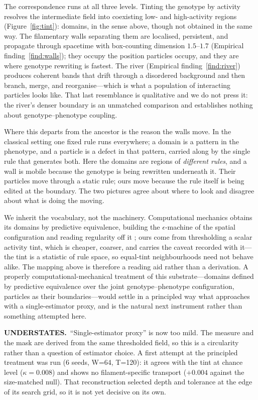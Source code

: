 \documentclass[man,12pt,floatsintext,donotrepeattitle]{apa7}
\newcommand{\flagged}[3]{%
  \par\vspace{3pt}\noindent
  \colorbox{#1}{\parbox{\dimexpr\linewidth-2\fboxsep\relax}{%
    \footnotesize\textbf{#2}\ #3}}%
  \par\vspace{3pt}}
\newcommand{\secref}[1]{\emph{\nameref{#1}}}
\begin{document}
The correspondence runs at all three levels. Tinting the genotype by activity
resolves the intermediate field into coexisting low- and high-activity regions
(Figure~\ref{fig:tint}): domains, in the sense above, though not obtained in
the same way. The filamentary walls separating them are localised, persistent,
and propagate through spacetime with box-counting dimension $1.5$--$1.7$
(Empirical finding~\ref{find:walls}); they occupy the position particles
occupy, and they are where genotype rewriting is fastest. The river (Empirical
finding~\ref{find:river}) produces coherent bands that drift through a
disordered background and then branch, merge, and reorganise---which is what a
population of interacting particles looks like. That last resemblance is
qualitative and we do not press it: the river's denser boundary is an unmatched
comparison and establishes nothing about genotype--phenotype coupling.

Where this departs from the ancestor is the reason the walls move. In the
classical setting one fixed rule runs everywhere; a domain is a pattern in the
phenotype, and a particle is a defect in that pattern, carried along by the
single rule that generates both. Here the domains are regions of
\emph{different rules}, and a wall is mobile because the genotype is being
rewritten underneath it. Their particles move through a static rule; ours move
because the rule itself is being edited at the boundary. The two pictures agree
about where to look and disagree about what is doing the moving.

We inherit the vocabulary, not the machinery. Computational mechanics obtains
its domains by predictive equivalence, building the $\epsilon$-machine of the
spatial configuration and reading regularity off it
\parencite{crutchfield1989inferring,shalizi2001computational}; ours come from
thresholding a scalar activity tint, which is cheaper, coarser, and carries the
caveat recorded with it---the tint is a statistic of rule space, so equal-tint
neighbourhoods need not behave alike. The mapping above is therefore a reading
aid rather than a derivation. A properly computational-mechanical treatment of
this substrate---domains defined by predictive equivalence over the joint
genotype--phenotype configuration, particles as their boundaries---would settle in a principled way what \secref{sec:eoc-compute} approaches
with a single-estimator proxy, and is the natural next instrument rather than
something attempted here.
\flagged{markArtifact}{UNDERSTATES.}{``Single-estimator proxy'' is now too mild.
The measure and the mask are derived from the same thresholded field, so this is
a circularity rather than a question of estimator choice. A first attempt at the
principled treatment was run (6 seeds, W=64, T=120): it agrees with the tint at
chance level ($\kappa = 0.008$) and shows no filament-specific transport
($+0.004$ against the size-matched null). That reconstruction selected depth and
tolerance at the edge of its search grid, so it is not yet decisive on its own.}
\end{document}
